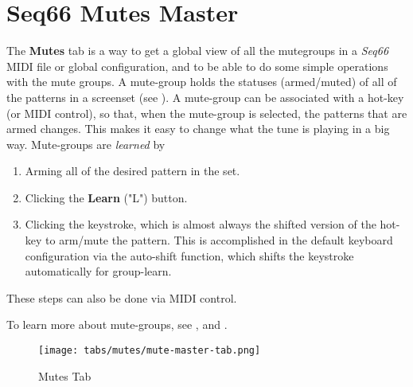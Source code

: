 %
%
%

\section{Seq66 Mutes Master}
\label{sec:mutes_master}

   The \textbf{Mutes} tab is a way to get a global view of all the mutegroups in
   a \textsl{Seq66} MIDI file or global configuration, and to be able to do
   some simple operations with the mute groups.
   A mute-group holds the statuses (armed/muted) of all of the patterns in
   a screenset (see ).
   A mute-group can be associated with a hot-key (or MIDI control), so that,
   when the mute-group is selected, the patterns that are armed changes.
   This makes it easy to change what the tune is playing in a big way.
   Mute-groups are \textsl{learned} by

   \begin{enumerate}
      \item Arming all of the desired pattern in the set.
      \item Clicking the \textbf{Learn} ("L") button.
      \item Clicking the keystroke, which is almost always the shifted version
         of the hot-key to arm/mute the pattern.
         This is accomplished in the default keyboard configuration via the
         auto-shift function, which shifts the keystroke automatically
         for group-learn.
   \end{enumerate}

   These steps can also be done via MIDI control.

   To learn more about mute-groups, see
   , and
   .


\begin{figure}[H]
   \centering 
   \texttt{[image: tabs/mutes/mute-master-tab.png]}
   \caption{Mutes Tab}
   \label{fig:mutes_master_tab}
\end{figure}

